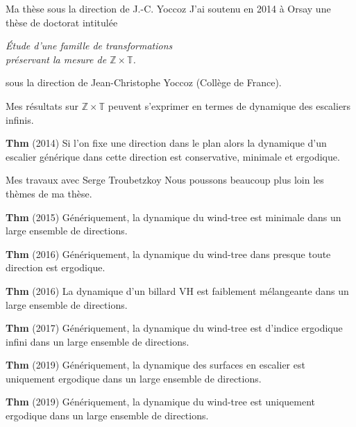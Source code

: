 \documentclass[
  french,
  ignorenonframetext,
]{beamer}
\begin{document}
\begin{frame}{Ma thèse sous la direction de J.-C. Yoccoz}
\protect\hypertarget{ma-thuxe8se-sous-la-direction-de-j.-c.-yoccoz}{}
J'ai soutenu en 2014 à Orsay une thèse de doctorat intitulée

\emph{Étude d'une famille de transformations\\
préservant la mesure de \(ℤ × 𝕋\).}

sous la direction de Jean-Christophe Yoccoz (Collège de France).

Mes résultats sur \(ℤ × 𝕋\) peuvent s'exprimer en termes de dynamique
des escaliers infinis.

\textbf{Thm} (2014) Si l'on fixe une direction dans le plan alors la
dynamique d'un escalier générique dans cette direction est conservative,
minimale et ergodique.
\end{frame}

\begin{frame}{Mes travaux avec Serge Troubetzkoy}
\protect\hypertarget{mes-travaux-avec-serge-troubetzkoy}{}
Nous poussons beaucoup plus loin les thèmes de ma thèse.

\textbf{Thm} (2015) Génériquement, la dynamique du wind-tree est
minimale dans un large ensemble de directions.

\textbf{Thm} (2016) Génériquement, la dynamique du wind-tree dans
presque toute direction est ergodique.

\textbf{Thm} (2016) La dynamique d'un billard VH est faiblement
mélangeante dans un large ensemble de directions.

\textbf{Thm} (2017) Génériquement, la dynamique du wind-tree est
d'indice ergodique infini dans un large ensemble de directions.

\textbf{Thm} (2019) Génériquement, la dynamique des surfaces en escalier
est uniquement ergodique dans un large ensemble de directions.

\textbf{Thm} (2019) Génériquement, la dynamique du wind-tree est
uniquement ergodique dans un large ensemble de directions.
\end{frame}
\end{document}
